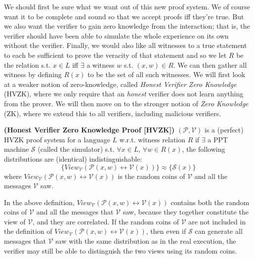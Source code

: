 		We should first be sure what we want out of this new proof system.  We of course want it to be complete and sound so that we accept proofs iff they're true.  But we also want the verifier to gain zero knowledge from the interaction; that is, the verifier should have been able to simulate the whole experience on its own without the verifier.
		Finally, we would also like all witnesses to a true statement to each be sufficient to prove the veracity of that statement and so we let $R$ be the relation s.t. $x \in L$ iff $\exists$ a witness $w$ s.t. $(x,w)\in R$.  We can then gather all witness by defining $R(x)$ to be the set of all such witnesses. We will first look at a weaker notion of zero-knowledge, called \textit{Honest Verifier Zero Knowledge} (HVZK), where we only require that an {\em honest} verifier does not learn anything from the prover. We will then move on to the stronger notion of \textit{Zero Knowledge} (ZK), where we extend this to all verifiers, including malicious verifiers.
		
		\begin{definition} {\normalfont\textbf{(Honest Verifier Zero Knowledge Proof [HVZK])}} 
			$(\mathcal{P},\mathcal{V})$ is a (perfect) HVZK proof system for a language $L$ w.r.t. witness relation $R$ if 
			$\exists$ a PPT machine $\mathcal{S}$ (called the simulator) s.t. $\forall x \in L$, $\forall w\in R(x)$, the following distributions are (identical) indistinguishable:
		$$\{View_{\mathcal{V}}(\mathcal{P}(x,w) \leftrightarrow \mathcal{V}(x))\} \approx \{\mathcal{S}(x)\}$$
		where $View_{\mathcal{V}}(\mathcal{P}(x,w) \leftrightarrow \mathcal{V}(x))$ is the random coins of $\mathcal{V}$ and all the messages $\mathcal{V}$ saw.
  \end{definition}

\begin{remark}
In the above definition, $View_{\mathcal{V}}(\mathcal{P}(x,w) \leftrightarrow \mathcal{V}(x))$ contains both the random coins of $\mathcal{V}$ and all the messages that $\mathcal{V}$ saw, because they together constitute the view of $\mathcal{V}$, and they are correlated. If the random coins of $\mathcal{V}$ are not included in the definition of $View_{\mathcal{V}}(\mathcal{P}(x,w) \leftrightarrow \mathcal{V}(x))$, then even if $\mathcal{S}$ can generate all messages that $\mathcal{V}$ saw with the same distribution as in the real execution, the verifier may still be able to distinguish the two views using its random coins.
\end{remark}

